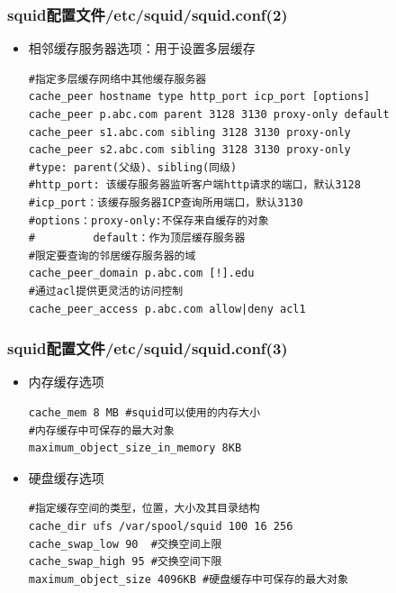 \documentclass[xcolor=svgnames,presentation]{beamer}
\begin{document}
\begin{frame}[fragile]
\frametitle{squid配置文件/etc/squid/squid.conf(2)}
\label{sec-4-3}
\begin{itemize}

\item 相邻缓存服务器选项：用于设置多层缓存\\
\label{sec-4-3-1}%
\begin{verbatim}
#指定多层缓存网络中其他缓存服务器
cache_peer hostname type http_port icp_port [options]
cache_peer p.abc.com parent 3128 3130 proxy-only default
cache_peer s1.abc.com sibling 3128 3130 proxy-only
cache_peer s2.abc.com sibling 3128 3130 proxy-only
#type: parent(父级)、sibling(同级)
#http_port: 该缓存服务器监听客户端http请求的端口，默认3128
#icp_port：该缓存服务器ICP查询所用端口，默认3130
#options：proxy-only:不保存来自缓存的对象
#         default：作为顶层缓存服务器
#限定要查询的邻居缓存服务器的域
cache_peer_domain p.abc.com [!].edu
#通过acl提供更灵活的访问控制
cache_peer_access p.abc.com allow|deny acl1
\end{verbatim}
\end{itemize} %
\end{frame}
\begin{frame}[fragile]
\frametitle{squid配置文件/etc/squid/squid.conf(3)}
\label{sec-4-4}
\begin{itemize}

\item 内存缓存选项\\
\label{sec-4-4-1}%
\begin{verbatim}
cache_mem 8 MB #squid可以使用的内存大小
#内存缓存中可保存的最大对象
maximum_object_size_in_memory 8KB
\end{verbatim}

\item 硬盘缓存选项\\
\label{sec-4-4-2}%
\begin{verbatim}
#指定缓存空间的类型，位置，大小及其目录结构
cache_dir ufs /var/spool/squid 100 16 256
cache_swap_low 90  #交换空间上限
cache_swap_high 95 #交换空间下限
maximum_object_size 4096KB #硬盘缓存中可保存的最大对象
\end{verbatim}
\end{itemize} %
\end{frame}
\end{document}
